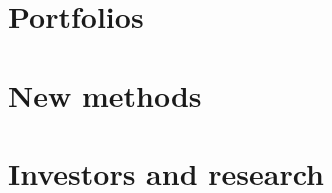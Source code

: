 \documentclass[12pt]{Beautybook-EN}
\begin{document}
\part{Portfolios}

\part{New methods}

\part{Investors and research}



\backmatter
\renewcommand{\thechapter}{}   %



\clearpage
\printindex

\thispagestyle{empty}

\end{document}
